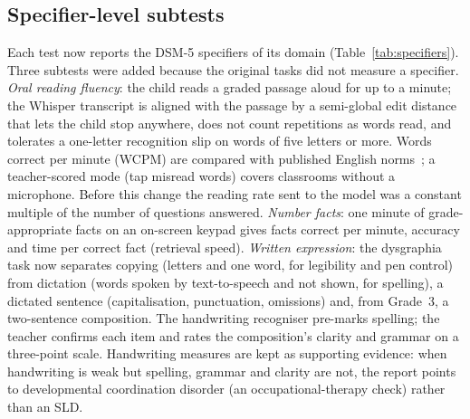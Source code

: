 \documentclass[conference]{IEEEtran}
\begin{document}
\subsection{Specifier-level subtests}
Each test now reports the DSM-5 specifiers of its domain (Table~\ref{tab:specifiers}).
Three subtests were added because the original tasks did not measure a specifier.
\emph{Oral reading fluency}: the child reads a graded passage aloud for up to a
minute; the Whisper transcript is aligned with the passage by a semi-global edit
distance that lets the child stop anywhere, does not count repetitions as words read,
and tolerates a one-letter recognition slip on words of five letters or more. Words
correct per minute (WCPM) are compared with published English norms~\cite{hasbrouck2017};
a teacher-scored mode (tap misread words) covers classrooms without a microphone.
Before this change the reading rate sent to the model was a constant multiple of the
number of questions answered. \emph{Number facts}: one minute of grade-appropriate
facts on an on-screen keypad gives facts correct per minute, accuracy and time per
correct fact (retrieval speed). \emph{Written expression}: the dysgraphia task now
separates copying (letters and one word, for legibility and pen control) from
dictation (words spoken by text-to-speech and not shown, for spelling), a dictated
sentence (capitalisation, punctuation, omissions) and, from Grade~3, a two-sentence
composition. The handwriting recogniser pre-marks spelling; the teacher confirms each
item and rates the composition's clarity and grammar on a three-point scale.
Handwriting measures are kept as supporting evidence: when handwriting is weak but
spelling, grammar and clarity are not, the report points to developmental
coordination disorder (an occupational-therapy check) rather than an SLD.
\end{document}
